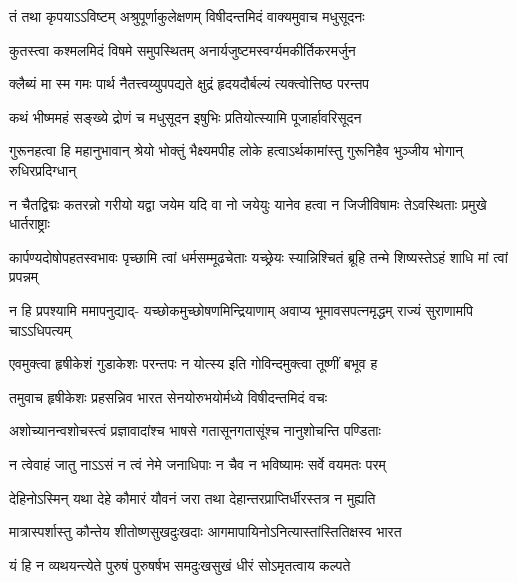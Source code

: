 \twolineshloka
{तं तथा कृपयाऽऽविष्टम् अश्रुपूर्णाकुलेक्षणम्}
{विषीदन्तमिदं वाक्यमुवाच मधुसूदनः}%

\twolineshloka
{कुतस्त्वा कश्मलमिदं विषमे समुपस्थितम्}
{अनार्यजुष्टमस्वर्ग्यमकीर्तिकरमर्जुन}%

\twolineshloka
{क्लैब्यं मा स्म गमः पार्थ नैतत्त्वय्युपपद्यते}
{क्षुद्रं हृदयदौर्बल्यं त्यक्त्वोत्तिष्ठ परन्तप}%

\twolineshloka
{कथं भीष्ममहं सङ्ख्ये द्रोणं च मधुसूदन}
{इषुभिः प्रतियोत्स्यामि पूजार्हावरिसूदन}%

\fourlineindentedshloka
{गुरूनहत्वा हि महानुभावान्}
{श्रेयो भोक्तुं भैक्ष्यमपीह लोके}
{हत्वाऽर्थकामांस्तु गुरूनिहैव}
{भुञ्जीय भोगान् रुधिरप्रदिग्धान्}%

\fourlineindentedshloka
{न चैतद्विद्मः कतरन्नो गरीयो}
{यद्वा जयेम यदि वा नो जयेयुः}
{यानेव हत्वा न जिजीविषामः}
{तेऽवस्थिताः प्रमुखे धार्तराष्ट्राः}%

\fourlineindentedshloka
{कार्पण्यदोषोपहतस्वभावः}
{पृच्छामि त्वां धर्मसम्मूढचेताः}
{यच्छ्रेयः स्यान्निश्चितं ब्रूहि तन्मे}
{शिष्यस्तेऽहं शाधि मां त्वां प्रपन्नम्}%

\fourlineindentedshloka
{न हि प्रपश्यामि ममापनुद्याद्-}
{यच्छोकमुच्छोषणमिन्द्रियाणाम्}
{अवाप्य भूमावसपत्नमृद्धम्}
{राज्यं सुराणामपि चाऽऽधिपत्यम्}%

\twolineshloka
{एवमुक्त्वा हृषीकेशं गुडाकेशः परन्तपः}
{न योत्स्य इति गोविन्दमुक्त्वा तूष्णीं बभूव ह}%

\twolineshloka
{तमुवाच हृषीकेशः प्रहसन्निव भारत}
{सेनयोरुभयोर्मध्ये विषीदन्तमिदं वचः}%

\twolineshloka
{अशोच्यानन्वशोचस्त्वं प्रज्ञावादांश्च भाषसे}
{गतासूनगतासूंश्च नानुशोचन्ति पण्डिताः}%

\twolineshloka
{न त्वेवाहं जातु नाऽऽसं न त्वं नेमे जनाधिपाः}
{न चैव न भविष्यामः सर्वे वयमतः परम्}%

\twolineshloka
{देहिनोऽस्मिन् यथा देहे कौमारं यौवनं जरा}
{तथा देहान्तरप्राप्तिर्धीरस्तत्र न मुह्यति}%

\twolineshloka
{मात्रास्पर्शास्तु कौन्तेय शीतोष्णसुखदुःखदाः}
{आगमापायिनोऽनित्यास्तांस्तितिक्षस्व भारत}%

\twolineshloka
{यं हि न व्यथयन्त्येते पुरुषं पुरुषर्षभ}
{समदुःखसुखं धीरं सोऽमृतत्वाय कल्पते}%

